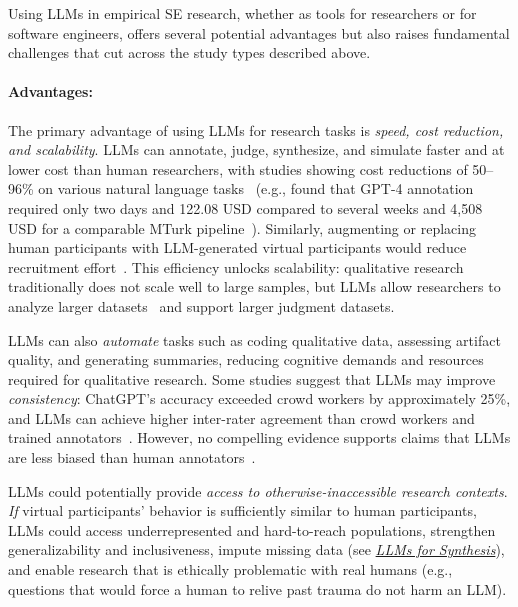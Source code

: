 \documentclass[smallextended]{svjour3}
\newcommand{\synthesis}{\hyperref[sec:llms-for-synthesis]{\emph{LLMs for Synthesis}}\xspace}
\newcommand{\synthesis}{\href{/study-types\#llms-for-synthesis}{\emph{LLMs for Synthesis}}\xspace}
\newcommand{\studytypeparagraph}[1]{\paragraph{\bfseries #1:}}
\newcommand{\studytypeparagraph}[1]{\subsubsection{#1}}
\begin{document}
Using LLMs in empirical SE research, whether as tools for researchers or for software engineers, offers several potential advantages but also raises fundamental challenges that cut across the study types described above.

\studytypeparagraph{Advantages}

The primary advantage of using LLMs for research tasks is \emph{speed, cost reduction, and scalability}. LLMs can annotate, judge, synthesize, and simulate faster and at lower cost than human researchers, with studies showing cost reductions of 50--96\% on various natural language tasks~\cite{DBLP:conf/emnlp/WangLXZZ21} (e.g., \citeauthor{DBLP:conf/chi/HeHDRH24} found that GPT-4 annotation required only two days and 122.08 USD compared to several weeks and 4,508 USD for a comparable MTurk pipeline~\cite{DBLP:conf/chi/HeHDRH24}). Similarly, augmenting or replacing human participants with LLM-generated virtual participants would reduce recruitment effort~\cite{DBLP:conf/vl/Madampe0HO24}. This efficiency unlocks scalability: qualitative research traditionally does not scale well to large samples, but LLMs allow researchers to analyze larger datasets~\cite{DBLP:journals/ase/BanoHZT24, DBLP:conf/wsese/BarrosANKKNB25, DBLP:conf/wsese/LecaVSS25} and support larger judgment datasets.

LLMs can also \emph{automate} tasks such as coding qualitative data, assessing artifact quality, and generating summaries, reducing cognitive demands and resources required for qualitative research. Some studies suggest that LLMs may improve \emph{consistency}: ChatGPT's accuracy exceeded crowd workers by approximately 25\%, and LLMs can achieve higher inter-rater agreement than crowd workers and trained annotators~\cite{DBLP:journals/corr/abs-2303-15056}. However, no compelling evidence supports claims that LLMs are less biased than human annotators~\cite{DBLP:journals/corr/abs-2303-15056}.

LLMs could potentially provide \emph{access to otherwise-inaccessible research contexts}. \textit{If} virtual participants' behavior is sufficiently similar to human participants, LLMs could access underrepresented and hard-to-reach populations, strengthen generalizability and inclusiveness, impute missing data (see \synthesis), and enable research that is ethically problematic with real humans (e.g., questions that would force a human to relive past trauma do not harm an LLM).
\end{document}
